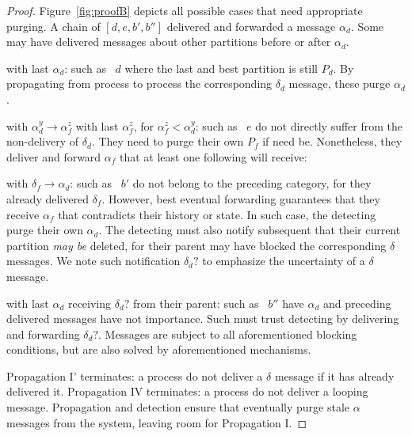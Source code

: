\begin{proof}
  Figure~\ref{fig:proofB} depicts all possible cases that need
  appropriate purging. A chain of \processes $[d, e, b', b'']$
  delivered and forwarded a message $\alpha_d$. Some \processes may
  have delivered messages about other partitions before or after
  $\alpha_d$.
  \begin{asparadesc}
  \item [\processes with last $\alpha_d$:] \Processes such as
    \Process~$d$ where the last and best partition is still $P_d$. By
    propagating from process to process the corresponding $\delta_d$
    message, these \processes purge $\alpha_d$.
  \item [\processes with $\alpha_d^y \rightarrow \alpha_f^z$ with last
    $\alpha_f^z$, for $\alpha_f^z < \alpha_d^y$:] \Processes such as
    \Process~$e$ do not directly suffer from the non-delivery of
    $\delta_d$. They need to purge their own $P_f$ if need
    be. Nonetheless, they deliver and forward $\alpha_f$ that at least
    one following \process will receive:
  \item [\processes with $\delta_f \rightarrow \alpha_d$:] \Processes
    such as \Process~$b'$ do not belong to the preceding category, for
    they already delivered $\delta_f$. However, best eventual
    forwarding guarantees that they receive $\alpha_f$ that
    contradicts their history or state. In such case, the detecting
    \processes purge their own $\alpha_d$. The detecting \processes
    must also notify subsequent \processes that their current
    partition \emph{may be} deleted, for their parent may have blocked
    the corresponding $\delta$ messages. We note such notification
    $\delta_d?$ to emphasize the uncertainty of a $\delta$ message.
  \item [\processes with last $\alpha_d$ receiving $\delta_d?$ from
    their parent:] \Processes such as \Process~$b''$ have $\alpha_d$
    and preceding delivered messages have not importance. Such
    \processes must trust detecting \processes by delivering and
    forwarding $\delta_d?$. Messages are subject to all aforementioned
    blocking conditions, but are also solved by aforementioned
    mechanisms.
  \end{asparadesc}

  Propagation I' terminates: a process do not deliver a $\delta$
  message if it has already delivered it. Propagation IV terminates: a
  process do not deliver a looping message.  Propagation and detection
  ensure that \processes eventually purge stale $\alpha$ messages from
  the system, leaving room for Propagation I.
\end{proof}

